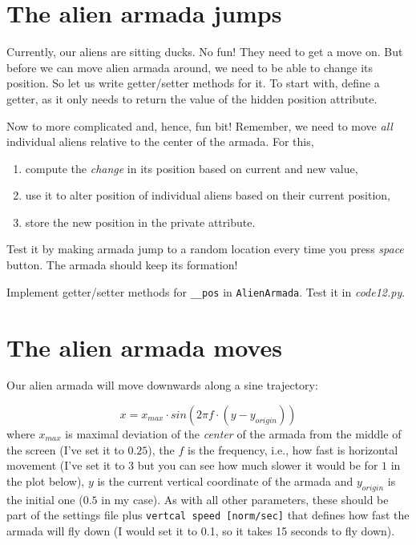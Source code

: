 \documentclass[
]{book}
\providecommand{\tightlist}{%
  \setlength{\itemsep}{0pt}\setlength{\parskip}{0pt}}
\begin{document}
\hypertarget{the-alien-armada-jumps}{%
\section{The alien armada jumps}\label{the-alien-armada-jumps}}

Currently, our aliens are sitting ducks. No fun! They need to get a move on. But before we can move alien armada around, we need to be able to change its position. So let us write getter/setter methods for it. To start with, define a getter, as it only needs to return the value of the hidden position attribute.

Now to more complicated and, hence, fun bit! Remember, we need to move \emph{all} individual aliens relative to the center of the armada. For this,

\begin{enumerate}
\def\labelenumi{\arabic{enumi}.}
\tightlist
\item
  compute the \emph{change} in its position based on current and new value,
\item
  use it to alter position of individual aliens based on their current position,
\item
  store the new position in the private attribute.
\end{enumerate}

Test it by making armada jump to a random location every time you press \emph{space} button. The armada should keep its formation!

Implement getter/setter methods for \texttt{\_\_pos} in \texttt{AlienArmada}.
Test it in \emph{code12.py}.

\hypertarget{the-alien-armada-moves}{%
\section{The alien armada moves}\label{the-alien-armada-moves}}

Our alien armada will move downwards along a sine trajectory:

\[x = x_{max} \cdot sin(2 \pi f \cdot (y-y_{origin})) \]
where \(x_{max}\) is maximal deviation of the \emph{center} of the armada from the middle of the screen (I've set it to \(0.25\)), the \(f\) is the frequency, i.e., how fast is horizontal movement (I've set it to \(3\) but you can see how much slower it would be for \(1\) in the plot below), \(y\) is the current vertical coordinate of the armada and \(y_{origin}\) is the initial one (\(0.5\) in my case). As with all other parameters, these should be part of the settings file plus \texttt{vertcal\ speed\ {[}norm/sec{]}} that defines how fast the armada will fly down (I would set it to 0.1, so it takes 15 seconds to fly down).
\end{document}
